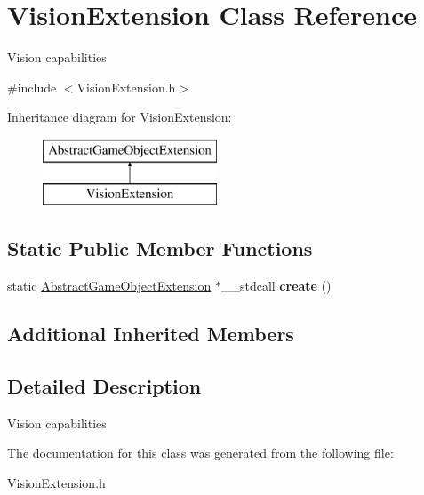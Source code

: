 \hypertarget{class_vision_extension}{}\section{Vision\+Extension Class Reference}
\label{class_vision_extension}


Vision capabilities  




{\ttfamily \#include $<$Vision\+Extension.\+h$>$}

Inheritance diagram for Vision\+Extension\+:\begin{figure}[H]
\begin{center}
\leavevmode
\includegraphics[height=2.000000cm]{class_vision_extension}
\end{center}
\end{figure}
\subsection*{Static Public Member Functions}
\begin{DoxyCompactItemize}
\item 
\mbox{\label{class_vision_extension_a56320099331767b9f62a3ccbac4aba06}} 
static \mbox{\hyperlink{class_abstract_game_object_extension}{Abstract\+Game\+Object\+Extension}} $\ast$\+\_\+\+\_\+stdcall {\bfseries create} ()
\end{DoxyCompactItemize}
\subsection*{Additional Inherited Members}


\subsection{Detailed Description}
Vision capabilities 



The documentation for this class was generated from the following file\+:\begin{DoxyCompactItemize}
\item 
Vision\+Extension.\+h\end{DoxyCompactItemize}
